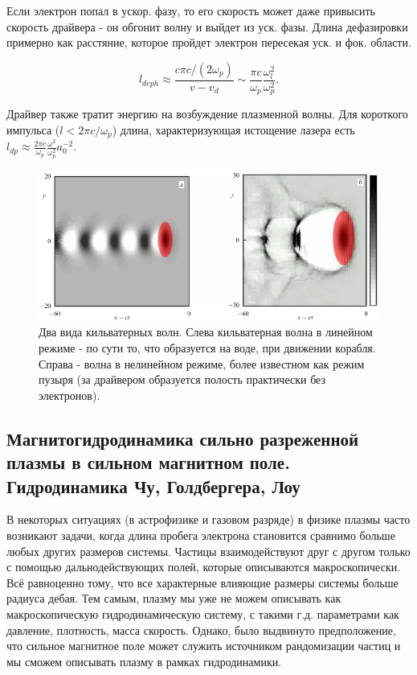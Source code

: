 \documentclass[10pt, a4paper]{article}
\begin{document}
Если электрон попал в ускор. фазу, то его скорость может даже привысить скорость драйвера - он обгонит волну и выйдет из
уск. фазы. Длина дефазировки примерно как расстяние, которое пройдет электрон пересекая уск. и фок. области.

\begin{equation}
    l_{deph}\approx \frac{c\pi c/(2\omega_p)}{v - v_d} \sim \frac{\pi c}{\omega_p}\frac{\omega_l^2}{\omega_p^2}.
\end{equation}

Драйвер также тратит энергию на возбуждение плазменной волны. Для короткого импульса ($l < 2\pi c/\omega_p$) длина, 
характеризующая истощение лазера есть $l_{dp}\approx \frac{2\pi c}{\omega_p} \frac{\omega^2}{\omega_p^2}a_0^{-2}$.



\begin{figure}[ht]
	\begin{center}
		\includegraphics[width=0.6\linewidth]{wake-f.png}
	\end{center}
	\caption{Два вида кильватерных волн. Слева кильватерная волна в линейном режиме - по сути то, что образуется на 
    воде, при движении корабля. Справа - волна в нелинейном режиме, более известном как режим пузыря (за драйвером
    образуется полость практически без электронов).}
\end{figure}



\subsection{Магнитогидродинамика сильно разреженной плазмы в сильном магнитном поле. Гидродинамика Чу, Голдбергера, Лоу}

	В некоторых ситуациях (в астрофизике и газовом разряде) в физике плазмы часто возникают задачи, когда длина пробега электрона становится сравнимо больше любых других размеров системы. Частицы взаимодействуют друг с другом только с помощью дальнодействующих полей, которые описываются макроскопически. Всё равноценно тому, что все характерные влияющие размеры системы больше радиуса дебая. Тем самым, плазму мы уже не можем описывать как макроскопическую гидродинамическую систему, с такими г.д. параметрами как давление, плотность, масса скорость. Однако, было выдвинуто предположение, что сильное магнитное поле может служить источником рандомизации частиц и мы сможем описывать плазму в рамках гидродинамики.
\end{document}

